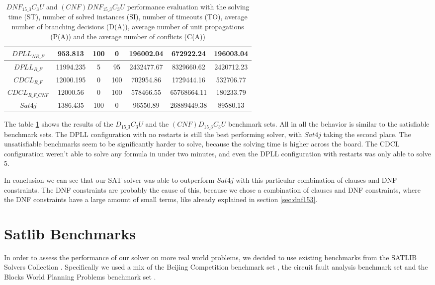 \begin{table}[!htb]
\centering
\caption[$DNF_{15\_3}C_3U$ and $(CNF)DNF_{15\_3}C_3U$ performance evaluation]{$DNF_{15\_3}C_3U$ and $(CNF)DNF_{15\_3}C_3U$ performance evaluation with the solving time (ST), number of solved instances (SI), number of timeouts (TO), average number of branching decisions (D(A)), average number of unit propagations (P(A)) and the average number of conflicts (C(A))}
\label{tab:dnfClauseBenchmarkUNSAT}
\begin{tabular}{|c|c|c|c|c|c|c|}
\hline
$DPLL_{NR\_F}$ & 953.813 & 100 & 0 & 196002.04 & 672922.24 & 196003.04 \\ 
\hline
$DPLL_{R\_F}$ & 11994.235 & 5 & 95 & 2432477.67 & 8329660.62 & 2420712.23 \\ 
\hline
$CDCL_{R\_F}$ & 12000.195 & 0 & 100 & 702954.86 & 1729444.16 & 532706.77 \\ 
\hline
$CDCL_{R\_F\_CNF}$ & 12000.56 & 0 & 100 & 578466.55 & 65768664.11 & 180233.79 \\ 
\hline
$Sat4j$ & 1386.435 & 100 & 0 & 96550.89 & 26889449.38 & 89580.13 \\ 
\hline
\end{tabular}
\end{table}

The table \ref{tab:dnfClauseBenchmarkUNSAT} shows the results of the $D_{15\_3}C_3U$ and the $(CNF)D_{15\_3}C_3U$ benchmark sets. All in all the behavior is similar to the satisfiable benchmark sets. The DPLL configuration with no restarts is still the best performing solver, with $Sat4j$ taking the second place. The unsatisfiable benchmarks seem to be significantly harder to solve, because the solving time is higher across the board. The CDCL configuration weren't able to solve any formula in under two minutes, and even the DPLL configuration with restarts was only able to solve 5.

In conclusion we can see that our SAT solver was able to outperform $Sat4j$ with this particular combination of clauses and DNF constraints. The DNF constraints are probably the cause of this, because we chose a combination of clauses and DNF constraints, where the DNF constraints have a large amount of small terms, like already explained in section \ref{sec:dnf153}.

\section{Satlib Benchmarks}

In order to assess the performance of our solver on more real world problems, we decided to use existing benchmarks from the SATLIB Solvers Collection \cite{noauthor_satlib_nodate-3}. Specifically we used a mix of the Beijing Competition benchmark set \cite{noauthor_satlib_nodate}, the circuit fault analysis benchmark set \cite{noauthor_satlib_nodate-1} and the Blocks World Planning Problems benchmark set \cite{noauthor_satlib_nodate-2}.

